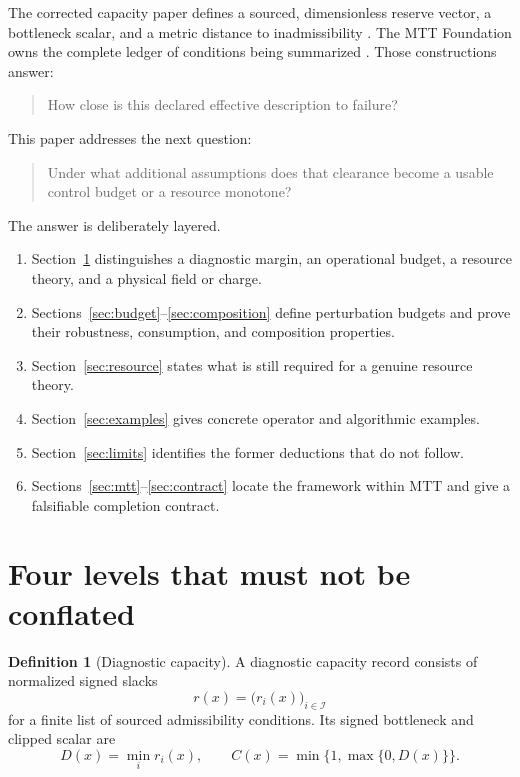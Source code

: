 \documentclass[11pt]{article}
\theoremstyle{definition}
\newtheorem{definition}[theorem]{Definition}
\theoremstyle{remark}
\newcommand{\cI}{\mathcal I}
\begin{document}
The corrected capacity paper defines a sourced, dimensionless reserve
vector, a bottleneck scalar, and a metric distance to inadmissibility
\cite{CapacityMargin2026}.  The MTT Foundation owns the complete ledger of
conditions being summarized \cite{MTTFoundation2026}.  Those constructions
answer:
\begin{quote}
How close is this declared effective description to failure?
\end{quote}
This paper addresses the next question:
\begin{quote}
Under what additional assumptions does that clearance become a usable
control budget or a resource monotone?
\end{quote}

The answer is deliberately layered.
\begin{enumerate}[leftmargin=2em]
\item Section~\ref{sec:levels} distinguishes a diagnostic margin, an
      operational budget, a resource theory, and a physical field or charge.
\item Sections~\ref{sec:budget}--\ref{sec:composition} define perturbation
      budgets and prove their robustness, consumption, and composition
      properties.
\item Section~\ref{sec:resource} states what is still required for a genuine
      resource theory.
\item Section~\ref{sec:examples} gives concrete operator and algorithmic
      examples.
\item Section~\ref{sec:limits} identifies the former deductions that do not
      follow.
\item Sections~\ref{sec:mtt}--\ref{sec:contract} locate the framework within
      MTT and give a falsifiable completion contract.
\end{enumerate}

\section{Four levels that must not be conflated}
\label{sec:levels}

\begin{definition}[Diagnostic capacity]
A diagnostic capacity record consists of normalized signed slacks
\[
 r(x)=\bigl(r_i(x)\bigr)_{i\in\cI}
\]
for a finite list of sourced admissibility conditions.  Its signed
bottleneck and clipped scalar are
\[
 D(x)=\min_i r_i(x),
 \qquad
 C(x)=\min\{1,\max\{0,D(x)\}\}.
\]
\end{definition}
\end{document}
